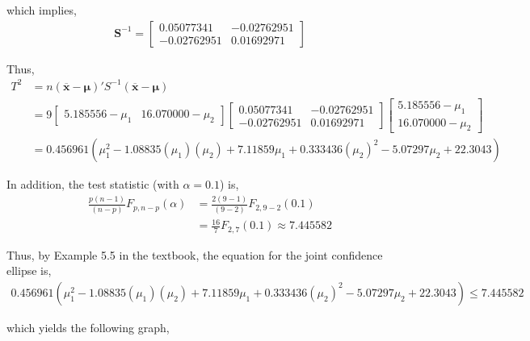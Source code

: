 \documentclass[12pt]{article}\usepackage[]{graphicx}\usepackage[]{color}
\newcommand{\vct}{\mathbf}
\begin{document}
which implies,
\begin{align*}
\vct{S}^{-1} = \begin{bmatrix} 0.05077341 & -0.02762951 \\ -0.02762951 & 0.01692971 \end{bmatrix}
\end{align*}

Thus, 
\begin{align*}
T^2 &= n(\vct{\overline{x}} - \vct{\mu})' S^{-1} (\vct{\overline{x}} - \vct{\mu})\\
&= 9 \begin{bmatrix} 5.185556 - \mu_1 & 16.070000 - \mu_2 \end{bmatrix} \begin{bmatrix} 0.05077341 & -0.02762951 \\ -0.02762951 & 0.01692971 \end{bmatrix} \begin{bmatrix} 5.185556 - \mu_1 \\ 16.070000 - \mu_2 \end{bmatrix}\\
&= 0.456961 (\mu_1^2 - 1.08835(\mu_1)(\mu_2) + 7.11859\mu_1 + 0.333436 (\mu_2)^2 - 5.07297\mu_2 + 22.3043)
\end{align*}

In addition, the test statistic (with $\alpha = 0.1$) is,
\begin{align*}
\frac{p(n-1)}{(n-p)}F_{p, n-p}(\alpha) &= \frac{2(9-1)}{(9-2)}F_{2, 9-2}(0.1)\\
&= \frac{16}{7}F_{2, 7}(0.1) \approx 7.445582
\end{align*}

Thus, by Example 5.5 in the textbook, the equation for the joint confidence ellipse is,
\begin{align*}
0.456961 (\mu_1^2 - 1.08835(\mu_1)(\mu_2) + 7.11859\mu_1 + 0.333436 (\mu_2)^2 - 5.07297\mu_2 + 22.3043) \leq 7.445582
\end{align*}

which yields the following graph,
\end{document}
